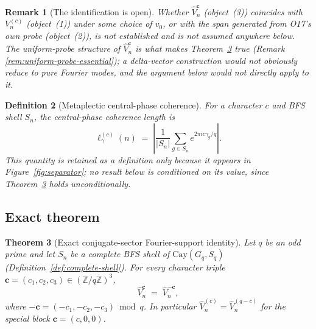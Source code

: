 \documentclass[11pt,a4paper]{article}
\newtheorem{theorem}{Theorem}[section]
\newtheorem{remark}[theorem]{Remark}
\newtheorem{definition}[theorem]{Definition}
\begin{document}
    \begin{remark}[The identification is open]
      \label{rem:open-bridge}
      Whether $\widehat V_n^{\mathbf{c}}$ (object~(3)) coincides with $V_n^{(c)}$ (object~(1)) under
      some choice of $v_0$, or with the span generated from O17's own probe (object~(2)), is not
      established and is not assumed anywhere below. The uniform-probe structure of
      $\widehat V_n^{\mathbf{c}}$ is what makes Theorem~\ref{thm:exact-rigidity} true (Remark
      \ref{rem:uniform-probe-essential}); a delta-vector construction would not obviously reduce to
      pure Fourier modes, and the argument below would not directly apply to it.
    \end{remark}

    \begin{definition}[Metaplectic central-phase coherence]
      \label{def:coherence-length}
      For a character $c$ and BFS shell $S_n$, the central-phase coherence length is
      \begin{equation}
        \label{eq:coherence-length}
        \ell_\gamma^{(c)}(n)
        \;=\;
        \left|
          \frac{1}{|S_n|}
          \sum_{g \in S_n} e^{2\pi i c \gamma_g / q}
        \right|.
      \end{equation}
      This quantity is retained as a definition only because it appears in
      Figure~\ref{fig:separator}; no result below is conditioned on its value, since
      Theorem~\ref{thm:exact-rigidity} holds unconditionally.
    \end{definition}

  \subsection{Exact theorem}
    \label{subsec:exact-theorem}

    \begin{theorem}[Exact conjugate-sector Fourier-support identity]
      \label{thm:exact-rigidity}
      Let $q$ be an odd prime and let $S_n$ be a complete BFS shell of $\mathrm{Cay}(G_q, S_q)$
      (Definition~\ref{def:complete-shell}). For every character triple
      $\mathbf{c}=(c_1,c_2,c_3) \in (\mathbb{Z}/q\mathbb{Z})^3$,
      \begin{equation}
        \widehat V_n^{\mathbf{c}} \;=\; \widehat V_n^{-\mathbf{c}},
      \end{equation}
      where $-\mathbf{c} = (-c_1,-c_2,-c_3) \bmod q$. In particular
      $\widehat V_n^{(c)} = \widehat V_n^{(q-c)}$ for the special block $\mathbf{c}=(c,0,0)$.
    \end{theorem}
\end{document}
